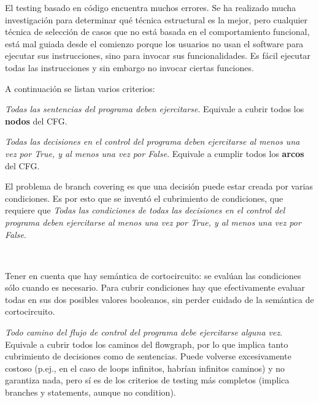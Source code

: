 \documentclass[]{article}
\begin{document}
El testing basado en código encuentra muchos errores. Se ha realizado mucha investigación para determinar qué técnica estructural es la mejor, pero cualquier técnica de selección de casos que no está basada en el comportamiento funcional, está mal guiada desde el comienzo porque los usuarios no usan el software para ejecutar sus instrucciones, sino para invocar sus funcionalidades. Es fácil ejecutar todas las instrucciones y sin embargo no invocar ciertas funciones.

A continuación se listan varios criterios:

\textit{Todas las sentencias del programa deben ejercitarse}. Equivale a cubrir todos los \textbf{nodos} del CFG.

\textit{Todas las decisiones en el control del programa deben ejercitarse al menos una vez por True, y al menos una vez por False}. Equivale a cumplir todos los \textbf{arcos} del CFG.

\begin{center}
\end{center}

El problema de branch covering es que una decisión puede estar creada por varias condiciones. Es por esto que se inventó el cubrimiento de condiciones, que requiere que \textit{Todas las condiciones de todas las decisiones en el control del programa deben ejercitarse al menos una vez por True, y al menos una vez por False}.

\begin{center}
	\\
\end{center}

Tener en cuenta que hay semántica de cortocircuito: se evalúan las condiciones sólo cuando es necesario. Para cubrir condiciones hay que efectivamente evaluar todas en sus dos posibles valores booleanos, sin perder cuidado de la semántica de cortocircuito.

\textit{Todo camino del flujo de control del programa debe ejercitarse alguna vez}. Equivale a cubrir todos los caminos del flowgraph, por lo que implica tanto cubrimiento de decisiones como de sentencias. Puede volverse excesivamente costoso (p.ej., en el caso de loops infinitos, habrían infinitos caminos) y no garantiza nada, pero sí es de los criterios de testing más completos (implica branches y statements, aunque no condition).
\end{document}
